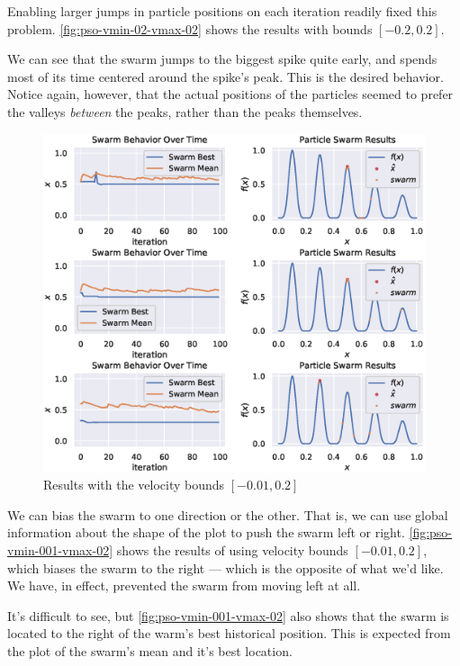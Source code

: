 \documentclass[12pt]{article}
\begin{document}
Enabling larger jumps in particle positions on each iteration readily fixed this problem.
\autoref{fig:pso-vmin-02-vmax-02} shows the results with bounds $[-0.2, 0.2]$.

We can see that the swarm jumps to the biggest spike quite early, and spends most of its time centered around the spike's peak.
This is the desired behavior.
Notice again, however, that the actual positions of the particles seemed to prefer the valleys \textit{between} the peaks, rather than the peaks themselves.

\begin{figure}[H]
    \centering
    \includegraphics[width=\textwidth]{figures/pso/pso-v001-v02.eps}
    \caption{Results with the velocity bounds $[-0.01, 0.2]$}\label{fig:pso-vmin-001-vmax-02}
\end{figure}

We can bias the swarm to one direction or the other.
That is, we can use global information about the shape of the plot to push the swarm left or right.
\autoref{fig:pso-vmin-001-vmax-02} shows the results of using velocity bounds $[-0.01, 0.2]$, which
biases the swarm to the right --- which is the opposite of what we'd like.
We have, in effect, prevented the swarm from moving left at all.

It's difficult to see, but \autoref{fig:pso-vmin-001-vmax-02} also shows that the swarm is located to the right of the warm's best historical position.
This is expected from the plot of the swarm's mean and it's best location.
\end{document}
